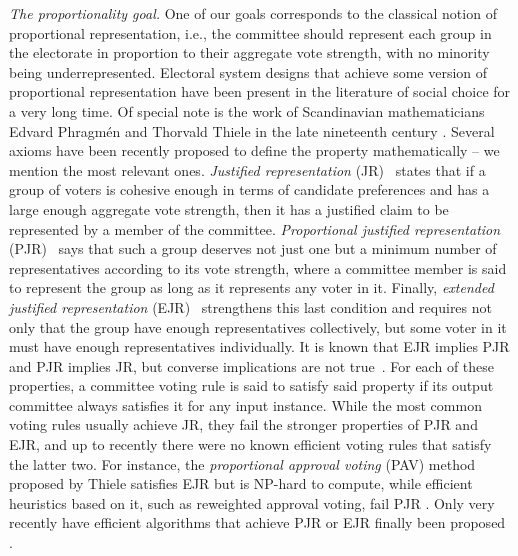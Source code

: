 \emph{The proportionality goal.}
One of our goals corresponds to the classical notion of proportional representation, i.e., the committee should represent each group in the electorate in proportion to their aggregate vote strength, with no minority being underrepresented. 
Electoral system designs that achieve some version of proportional representation have been present in the literature of social choice for a very long time. Of special note is the work of Scandinavian mathematicians Edvard Phragm\'{e}n and Thorvald Thiele in the late nineteenth century \cite{phragmen1894methode, phragmen1895proportionella, phragmen1896theorie, phragmen1899till, thiele1895om, janson2016phragmen}. 
Several axioms have been recently proposed to define the property mathematically -- we mention the most relevant ones. 
\emph{Justified representation} (JR)~\cite{aziz2017justified} states that if a group of voters is cohesive enough in terms of candidate preferences and has a large enough aggregate vote strength, then it has a justified claim to be represented by a member of the committee.
\emph{Proportional justified representation} (PJR)~\cite{sanchez2017proportional} says that such a group deserves not just one but a minimum number of representatives according to its vote strength, where a committee member is said to represent the group as long as it represents any voter in it.
Finally, \emph{extended justified representation} (EJR)~\cite{aziz2017justified} strengthens this last condition and requires not only that the group have enough representatives collectively, but some voter in it must have enough representatives individually.
It is known that EJR implies PJR and PJR implies JR, but converse implications are not true~\cite{sanchez2017proportional}. %
For each of these properties, a committee voting rule is said to satisfy said property if its output committee always satisfies it for any input instance. 
While the most common voting rules usually achieve JR, they fail the stronger properties of PJR and EJR, and up to recently there were no known efficient voting rules that satisfy the latter two. 
For instance, the \emph{proportional approval voting} (PAV) method \cite{thiele1895om, janson2016phragmen} proposed by Thiele satisfies EJR but is NP-hard to compute, while efficient heuristics based on it, such as reweighted approval voting, fail PJR \cite{aziz2014computational, skowron2016finding, aziz2017justified}. 
Only very recently have efficient algorithms that achieve PJR or EJR finally been proposed \cite{brill2017phragmen, sanchez2016maximin, aziz2018complexity, peters2019proportionality}. 

